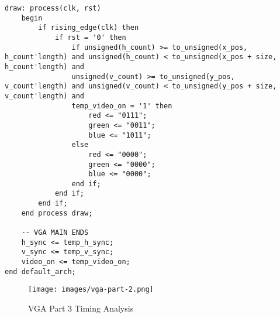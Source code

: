\documentclass{article}
\begin{document}
\begin{lstlisting}[caption=VGA Entity for Part 3, label=lst:vga-entity-part-3]
	draw: process(clk, rst)
	begin
		if rising_edge(clk) then
			if rst = '0' then
				if unsigned(h_count) >= to_unsigned(x_pos, h_count'length) and unsigned(h_count) < to_unsigned(x_pos + size, h_count'length) and
                unsigned(v_count) >= to_unsigned(y_pos, v_count'length) and unsigned(v_count) < to_unsigned(y_pos + size, v_count'length) and
                temp_video_on = '1' then  
					red <= "0111";
					green <= "0011";
					blue <= "1011";
				else
					red <= "0000";
					green <= "0000";
					blue <= "0000";
				end if;
			end if;
		end if;
	end process draw;

	-- VGA MAIN ENDS
	h_sync <= temp_h_sync;
	v_sync <= temp_v_sync;
	video_on <= temp_video_on;
end default_arch;
\end{lstlisting}

\begin{figure}[H]
  \centering
  \texttt{[image: images/vga-part-2.png]}
  \caption{VGA Part 3 Timing Analysis}
\end{figure}
\end{document}
